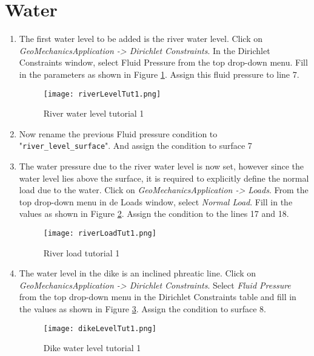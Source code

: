 \section{Water}
\begin{enumerate}[resume]
	\item The first water level to be added is the river water level. Click on \textit{GeoMechanicsApplication -> Dirichlet Constraints}. In the Dirichlet Constraints window, select Fluid Pressure from the top drop-down menu. Fill in the parameters as shown in Figure \ref{fig:tut1_river_level}. Assign this fluid pressure to line 7.
	
	\begin{figure}[h!]		
		\texttt{[image: riverLevelTut1.png]}
		\caption{River water level tutorial 1}
		\label{fig:tut1_river_level}
	\end{figure}
	
	\item Now rename the previous Fluid pressure condition to "\verb|river_level_surface|". And assign the condition to surface 7
	
	\item The water pressure due to the river water level is now set, however since the water level lies above the surface, it is required to explicitly define the normal load due to the water. Click on \textit{GeoMechanicsApplication -> Loads}. From the top drop-down menu in de Loads window, select \textit{Normal Load}. Fill in the values as shown in Figure \ref{fig:tut1_river_load}. Assign the condition to the lines 17 and 18. 
		
	\begin{figure}[h!]		
		\texttt{[image: riverLoadTut1.png]}
		\caption{River load tutorial 1}
		\label{fig:tut1_river_load}
	\end{figure}

	\item The water level in the dike is an inclined phreatic line. Click on \textit{GeoMechanicsApplication -> Dirichlet Constraints}. Select \textit{Fluid Pressure} from the top drop-down menu in the Dirichlet Constraints table and fill in the values as shown in Figure \ref{fig:tut1_dike_level}. Assign the condition to surface 8. 
	
	\begin{figure}[h!]		
		\texttt{[image: dikeLevelTut1.png]}
		\caption{Dike water level tutorial 1}
		\label{fig:tut1_dike_level}
	\end{figure}
	

\end{enumerate}
